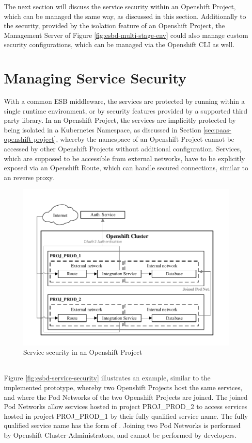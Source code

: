 The next section will discuss the service security within an Openshift Project, which can be managed the same way, as discussed in this section. Additionally to the security, provided by the isolation feature of an Openshift Project, the Management Server of Figure \vref{fig:esbd-multi-stage-env} could also manage custom security configurations, which can be managed via the Openshift CLI as well. 

\section{Managing Service Security}
\label{sec:esbd-service-security}
With a common ESB middleware, the services are protected by running within a single runtime environment, or by security features provided by a supported third party library. In an Openshift Project, the services are implicitly protected by being isolated in a Kubernetes Namespace, as discussed in Section \vref{sec:paas-openshift-project}, whereby the namespace of an Openshift Project cannot be accessed by other Openshift Projects without additional configuration. Services, which are supposed to be accessible from external networks, have to be explicitly exposed via an Openshift Route, which can handle secured connections, similar to an reverse proxy.
\newpage

\begin{figure}[htbp]
	\centering
	\includegraphics[scale=1]{images/esbd-service-security.pdf}
	\caption{Service security in an Openshift Project}
	\label{fig:esbd-service-security}
\end{figure}
\ \\
Figure \vref{fig:esbd-service-security} illustrates an example, similar to the implemented prototype, whereby two Openshift Projects host the same services, and where the Pod Networks of the two Openshift Projects are joined. The joined Pod Networks allow services hosted in project PROJ\_PROD\_2 to access services hosted in project PROJ\_PROD\_1 by their fully qualified service name. The fully qualified service name has the form of . Joining two Pod Networks is performed by Openshift Cluster-Administrators, and cannot be performed by developers. \\

